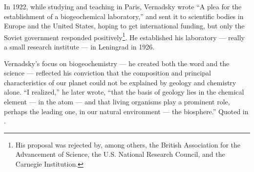 \documentclass[11pt,a4paper]{article}
\begin{document}
In 1922, while studying and teaching in Paris, Vernadsky wrote “A plea for the
establishment of a biogeochemical laboratory,” and sent it to scientific
bodies in Europe and the United States, hoping to get international funding,
but only the Soviet government responded positively\footnote{His proposal was
  rejected by, among others, the British Association for the Advancement of
  Science, the U.S. National Research Council, and the Carnegie Institution.}.
He established his laboratory — really a small research institute — in
Leningrad in 1926.

Vernadsky’s focus on biogeochemistry — he created both the word and the
science — reflected his conviction that the composition and principal
characteristics of our planet could not be explained by geology and chemistry
alone. “I realized,” he later wrote, “that the basis of geology lies in the
chemical element — in the atom — and that living organisms play a prominent
role, perhaps the leading one, in our natural environment — the biosphere.”
Quoted in \cite[p. 185]{5}.
\end{document}
